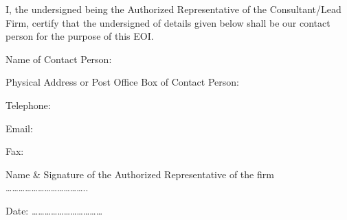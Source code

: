 I, the undersigned being the Authorized Representative of the
Consultant/Lead Firm, certify that the undersigned of details given
below shall be our contact person for the purpose of this EOI.

Name of Contact Person:

Physical Address or Post Office Box of Contact Person:

Telephone:

Email:

Fax:

Name \& Signature of the Authorized Representative of the firm
\ldots{}\ldots{}\ldots{}\ldots{}\ldots{}\ldots{}\ldots{}\ldots{}\ldots{}\ldots{}\ldots{}\ldots{}..

Date:
\ldots{}\ldots{}\ldots{}\ldots{}\ldots{}\ldots{}\ldots{}\ldots{}\ldots{}\ldots{}\ldots{}

